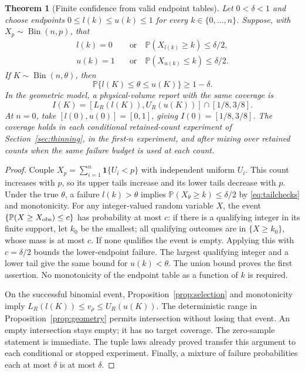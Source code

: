 \documentclass[11pt]{article}
\newtheorem{theorem}{Theorem}[section]
\theoremstyle{remark}
\newcommand{\Prb}{\mathbb P}
\newcommand{\Bin}{\operatorname{Bin}}
\newcommand{\ind}{\mathbf 1}
\begin{document}
\begin{theorem}[Finite confidence from valid endpoint tables]
\label{thm:report}
Let $0<\delta<1$ and choose endpoints $0\le l(k)\le u(k)\le1$ for
every $k\in\{0,\ldots,n\}$. Suppose, with $X_p\sim\Bin(n,p)$, that
\begin{align}
 l(k)=0\quad&\text{or}\quad\Prb(X_{l(k)}\ge k)\le\delta/2,\label{eq:tailchecks}\\
 u(k)=1\quad&\text{or}\quad\Prb(X_{u(k)}\le k)\le\delta/2.\nonumber
\end{align}
If $K\sim\Bin(n,\theta)$, then
\[
 \Prb\{l(K)\le\theta\le u(K)\}\ge1-\delta.
\]
In the geometric model, a physical-volume report with the same coverage is
\begin{equation}\label{eq:physical-report}
 I(K)=[L_R(l(K)),U_R(u(K))]\cap[1/8,3/8].
\end{equation}
At $n=0$, take $[l(0),u(0)]=[0,1]$, giving $I(0)=[1/8,3/8]$.
The coverage holds in each conditional retained-count experiment of
Section~\ref{sec:thinning}, in the first-$n$ experiment, and after mixing
over retained counts when the same failure budget is used at each count.
\end{theorem}
\begin{proof}
Couple $X_p=\sum_{i=1}^n\ind\{U_i<p\}$ with independent uniform
$U_i$. This count increases with $p$, so its upper tails increase and
its lower tails decrease with $p$. Under the true $\theta$, a failure
$l(k)>\theta$ implies
$\Prb(X_\theta\ge k)\le\delta/2$ by \eqref{eq:tailchecks} and
monotonicity. For any integer-valued random variable $X$, the event
$\{\Prb(X\ge X_{\rm obs})\le c\}$ has probability at most $c$:
if there is a qualifying integer in its finite support, let $k_0$ be the
smallest; all qualifying outcomes are in $\{X\ge k_0\}$, whose mass is
at most $c$. If none qualifies the event is empty. Applying this with
$c=\delta/2$ bounds the lower-endpoint failure. The largest qualifying
integer and a lower tail give the same bound for $u(k)<\theta$.
The union bound proves the first assertion. No monotonicity of the
endpoint table as a function of $k$ is required.

On the successful binomial event, Proposition~\ref{prop:selection} and
monotonicity imply $L_R(l(K))\le v_\rho\le U_R(u(K))$.
The deterministic range in Proposition~\ref{prop:geometry} permits
intersection without losing that event. An empty intersection stays empty;
it has no target coverage. The zero-sample statement is immediate.
The tuple laws already proved transfer this argument to each conditional
or stopped experiment. Finally, a mixture of failure probabilities each
at most $\delta$ is at most $\delta$.
\end{proof}
\end{document}
